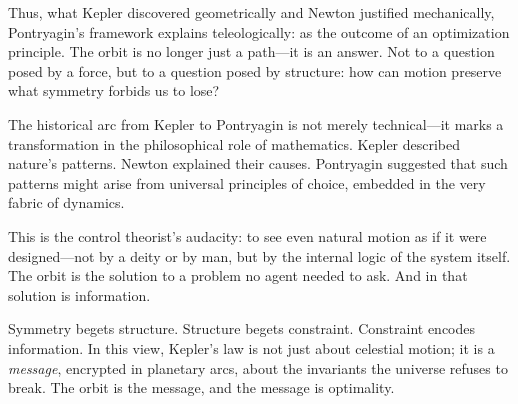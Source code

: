 Thus, what Kepler discovered geometrically and Newton justified mechanically, Pontryagin’s framework explains teleologically: as the outcome of an optimization principle. The orbit is no longer just a path—it is an answer. Not to a question posed by a force, but to a question posed by structure: how can motion preserve what symmetry forbids us to lose?

The historical arc from Kepler to Pontryagin is not merely technical—it marks a transformation in the philosophical role of mathematics. Kepler described nature’s patterns. Newton explained their causes. Pontryagin suggested that such patterns might arise from universal principles of choice, embedded in the very fabric of dynamics.

This is the control theorist’s audacity: to see even natural motion as if it were designed—not by a deity or by man, but by the internal logic of the system itself. The orbit is the solution to a problem no agent needed to ask. And in that solution is information.

Symmetry begets structure. Structure begets constraint. Constraint encodes information. In this view, Kepler’s law is not just about celestial motion; it is a \emph{message}, encrypted in planetary arcs, about the invariants the universe refuses to break. The orbit is the message, and the message is optimality.

